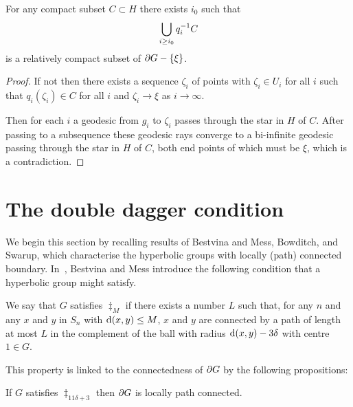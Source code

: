 \documentclass[a4paper]{article}
\begin{document}
\begin{lemma}\label{lem:propermaps} 
  For any compact subset $C \subset H$ there exists $i_0$ such that
  \begin{align*}
    \bigcup_{i\geq i_0} q_i^{-1} C
  \end{align*}
  is a relatively compact subset of $\partial G - \left\{\xi\right\}$.
\end{lemma}

\begin{proof}
  If not then there exists a sequence $\zeta_i$ of points with $\zeta_i \in U_i$ 
  for all $i$ such that $q_i(\zeta_i) \in C$ for all $i$ and $\zeta_i \to \xi$ 
  as $i \to \infty$.

  Then for each $i$ a geodesic from $g_i$ to $\zeta_i$ passes through the star 
  in $H$ of $C$.  After passing to a subsequence these geodesic rays converge to 
  a bi-infinite geodesic passing through the star in $H$ of $C$, both end points 
  of which must be $\xi$, which is a contradiction.
\end{proof}

\section{The double dagger condition}

We begin this section by recalling results of Bestvina and Mess, Bowditch, and
Swarup, which characterise the hyperbolic groups with locally (path) connected
boundary. In~\cite{bestvinamess91}, Bestvina and Mess introduce the following
condition that a hyperbolic group might satisfy.

\begin{definition}
  We say that $G$ satisfies $\ddag_M$ if there exists a number $L$ such that,
  for any $n$ and any $x$ and $y$ in $S_n$ with $\operatorname{d}(x,y) \leq M$, $x$ and
  $y$ are connected by a path of length at most $L$ in the complement of the
  ball with radius $\operatorname{d}(x,y) - 3\delta$ with centre $1 \in G$.
\end{definition}

This property is linked to the connectedness of $\partial G$ by the following
propositions:

\begin{proposition}\cite[Proposition 3.2]{bestvinamess91}
  If $G$ satisfies $\ddag_{11\delta + 3}$ then $\partial G$ is locally path
  connected.
\end{proposition}
\end{document}
